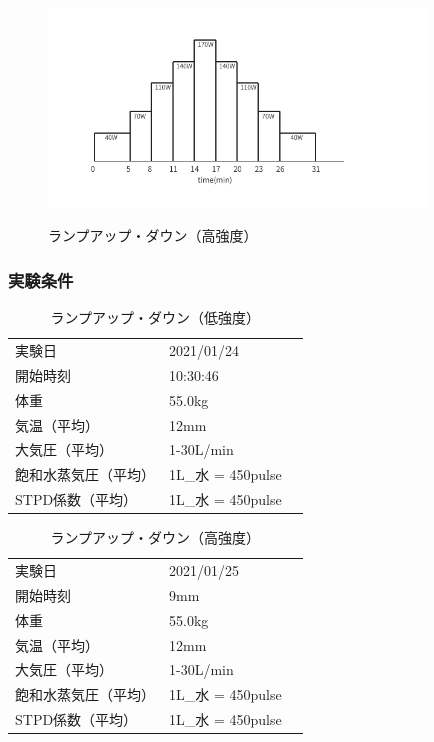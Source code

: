 \begin{figure}[h]
  \begin{center}
    \label{fig:protocol_rampup_hard}
    \includegraphics[width=10cm]{fig/protocol_rampup_hard.pdf}
    \caption{ランプアップ・ダウン（高強度）}
  \end{center}
\end{figure}

\subsubsection{実験条件}

\begin{table}[h]
  \begin{center}
  \caption{ランプアップ・ダウン（低強度）}
  \label{tb:YFS201_specsheet}
    \begin{tabular}{ll}
      実験日 & 2021/01/24 \\
      開始時刻 & 10:30:46 \\
      体重 & 55.0kg \\
      気温（平均） & 12mm \\
      大気圧（平均） & 1-30L/min \\
      飽和水蒸気圧（平均） & 1L_{水} = 450pulse　\\
      STPD係数（平均） & 1L_{水} = 450pulse
    \end{tabular}
  \end{center}
\end{table}

\begin{table}[h]
  \begin{center}
  \caption{ランプアップ・ダウン（高強度）}
  \label{tb:YFS201_specsheet}
    \begin{tabular}{ll}
      実験日 & 2021/01/25 \\
      開始時刻 & 9mm \\
      体重 & 55.0kg \\
      気温（平均） & 12mm \\
      大気圧（平均） & 1-30L/min \\
      飽和水蒸気圧（平均） & 1L_{水} = 450pulse　\\
      STPD係数（平均） & 1L_{水} = 450pulse
    \end{tabular}
  \end{center}
\end{table}

